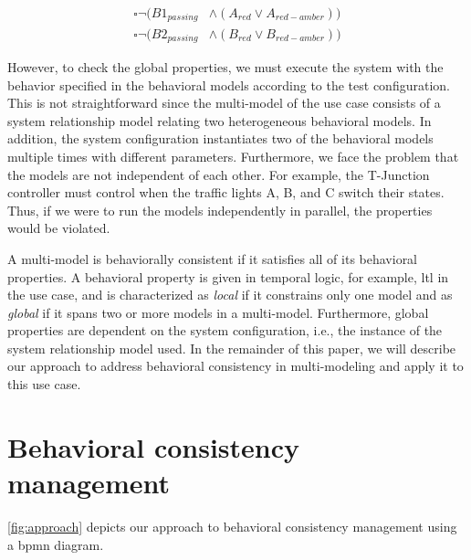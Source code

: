 \documentclass{jot}
\begin{document}
\begin{align}
    \square\neg(B1_{passing} & \land (A_{red} \lor A_{red-amber})) \label{eq:property3} \\
    \square\neg(B2_{passing} & \land (B_{red} \lor B_{red-amber})) \label{eq:property4}
\end{align}

However, to check the global properties, we must execute the system with the behavior specified in the behavioral models according to the test configuration.
This is not straightforward since the multi-model of the use case consists of a system relationship model relating two heterogeneous behavioral models.
In addition, the system configuration instantiates two of the behavioral models multiple times with different parameters.
Furthermore, we face the problem that the models are not independent of each other.
For example, the T-Junction controller must control when the traffic lights A, B, and C switch their states.
Thus, if we were to run the models independently in parallel, the properties would be violated.

A multi-model is behaviorally consistent if it satisfies all of its behavioral properties.
A behavioral property is given in temporal logic, for example, \gls*{ltl} in the use case, and is characterized as \emph{local} if it constrains only one model and as \emph{global} if it spans two or more models in a multi-model.
Furthermore, global properties are dependent on the system configuration, i.e., the instance of the system relationship model used.
In the remainder of this paper, we will describe our approach to address behavioral consistency in multi-modeling and apply it to this use case.


\section{Behavioral consistency management} \label{sec:behavioral_consistency_checking}
\autoref{fig:approach} depicts our approach to behavioral consistency management using a \gls*{bpmn} diagram.
\end{document}
